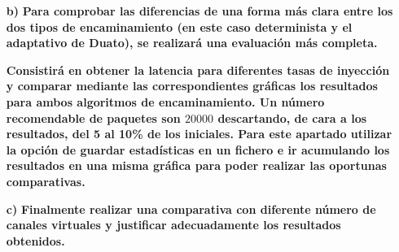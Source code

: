\begin{itemize}
    \item [\textbf{b)}] \textbf{Para comprobar las diferencias de una forma más clara entre los dos tipos de encaminamiento (en este caso determinista y el adaptativo de Duato), se realizará una evaluación más completa.}

    \textbf{Consistirá en obtener la latencia para diferentes tasas de inyección y comparar mediante las correspondientes gráficas los resultados para ambos algoritmos de encaminamiento. Un número recomendable de paquetes son $20000$ descartando, de cara a los resultados, del 5 al 10\% de los iniciales. Para este apartado utilizar la opción de guardar estadísticas en un fichero e ir acumulando los resultados en una misma gráfica para poder realizar las oportunas comparativas.}

    \item[\textbf{c)}] \textbf{Finalmente realizar una comparativa con diferente número de canales virtuales y justificar adecuadamente los resultados obtenidos.} 
    
\end{itemize}